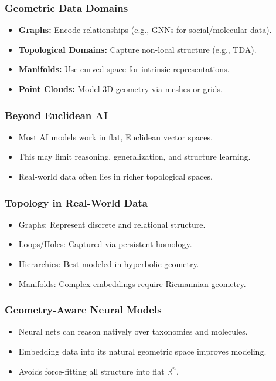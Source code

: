 \begin{frame}[fragile]\frametitle{Geometric Data Domains}
  \begin{itemize}
    \item \textbf{Graphs:} Encode relationships (e.g., GNNs for social/molecular data).
    \item \textbf{Topological Domains:} Capture non-local structure (e.g., TDA).
    \item \textbf{Manifolds:} Use curved space for intrinsic representations.
    \item \textbf{Point Clouds:} Model 3D geometry via meshes or grids.
  \end{itemize}
\end{frame}


\begin{frame}[fragile]\frametitle{Beyond Euclidean AI}
  \begin{itemize}
    \item Most AI models work in flat, Euclidean vector spaces.
    \item This may limit reasoning, generalization, and structure learning.
    \item Real-world data often lies in richer topological spaces.
  \end{itemize}
\end{frame}

\begin{frame}[fragile]\frametitle{Topology in Real-World Data}
  \begin{itemize}
    \item Graphs: Represent discrete and relational structure.
    \item Loops/Holes: Captured via persistent homology.
    \item Hierarchies: Best modeled in hyperbolic geometry.
    \item Manifolds: Complex embeddings require Riemannian geometry.
  \end{itemize}
\end{frame}

\begin{frame}[fragile]\frametitle{Geometry-Aware Neural Models}
  \begin{itemize}
    \item Neural nets can reason natively over taxonomies and molecules.
    \item Embedding data into its natural geometric space improves modeling.
    \item Avoids force-fitting all structure into flat $\mathbb{R}^n$.
  \end{itemize}
\end{frame}

